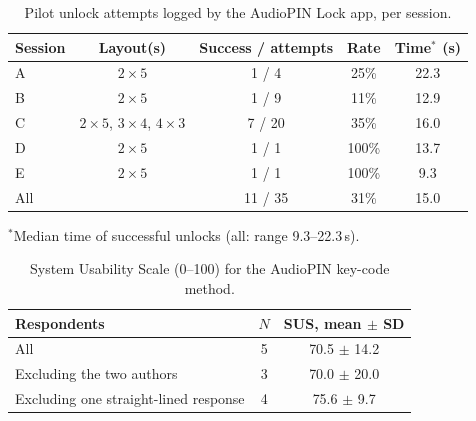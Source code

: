 \begin{table}[t]
\centering
\caption{Pilot unlock attempts logged by the AudioPIN Lock app, per session.}
\label{tab:study}
\setlength{\tabcolsep}{4pt}
\begin{tabular}{lcccc}
\toprule
Session & Layout(s) & Success / attempts & Rate & Time$^{*}$ (s) \\
\midrule
A & $2\times5$                  & 1 / 4   & 25\%  & 22.3 \\
B & $2\times5$                  & 1 / 9   & 11\%  & 12.9 \\
C & $2\times5$, $3\times4$, $4\times3$ & 7 / 20  & 35\%  & 16.0 \\
D & $2\times5$                  & 1 / 1   & 100\% & 13.7 \\
E & $2\times5$                  & 1 / 1   & 100\% & 9.3 \\
\midrule
All &                           & 11 / 35 & 31\%  & 15.0 \\
\bottomrule
\end{tabular}

\vspace{2pt}
{\footnotesize $^{*}$Median time of successful unlocks (all: range 9.3--22.3\,s).}
\end{table}

\begin{table}[t]
\centering
\caption{System Usability Scale (0--100) for the AudioPIN key-code method.}
\label{tab:sus}
\begin{tabular}{lcc}
\toprule
Respondents & $N$ & SUS, mean $\pm$ SD \\
\midrule
All                          & 5 & 70.5 $\pm$ 14.2 \\
Excluding the two authors    & 3 & 70.0 $\pm$ 20.0 \\
Excluding one straight-lined response & 4 & 75.6 $\pm$ 9.7 \\
\bottomrule
\end{tabular}
\end{table}
